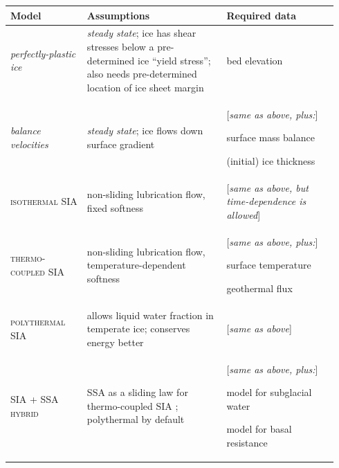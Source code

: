 \newcommand{\nolist}[1]{[\emph{#1}] \vspace{0.1in}}

\begin{table}[ht]
\small\medskip
\begin{tabular}{p{0.22\linewidth}p{0.40\linewidth}p{0.32\linewidth}}
\toprule
\textbf{Model} & \textbf{Assumptions} & \textbf{Required data} \\
\midrule
\vspace{2mm}  \emph{perfectly-plastic ice} \small & \vspace{2mm}\emph{steady state}; ice has shear stresses below a pre-determined ice ``yield stress''; also needs pre-determined location of ice sheet margin  \vspace{2mm} & \vspace{2mm} \begin{tightlist} \item bed elevation \end{tightlist} \\
\emph{balance velocities} \small & \emph{steady state}; ice flows down surface gradient \cite{JoughinetalGrBal97} & \nolist{same as above, plus:}  \begin{tightlist} \item surface mass balance \item (initial) ice thickness \end{tightlist} \\
\textsc{isothermal SIA} & non-sliding lubrication flow, fixed softness \cite{BLKCB,EISMINT96} & \nolist{same as above, but time-dependence is allowed} \\
\textsc{thermo-coupled SIA} & non-sliding lubrication flow, temperature-dependent softness \cite{BBL,EISMINT00} & \nolist{same as above, plus:} \begin{tightlist} \item surface temperature \item geothermal flux \end{tightlist} \\
\textsc{polythermal SIA} & allows liquid water fraction in temperate ice; conserves energy better \cite{AschwandenBuelerKhroulevBlatter,Greve} \vspace{2mm} & \nolist{same as above} \\
\textsc{SIA + SSA hybrid} & SSA as a sliding law for thermo-coupled SIA \cite{BBssasliding,Winkelmannetal2011}; polythermal by default & \nolist{same as above, plus:} \begin{tightlist} \item model for subglacial water \item model for basal resistance \end{tightlist} \\

\end{tabular}
\end{table}
